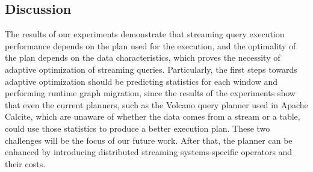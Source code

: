 %             
%             
%             


\subsection{Discussion}

The results of our experiments demonstrate that streaming query execution performance depends on the plan used for the execution, and the optimality of the plan depends on the data characteristics, which proves the necessity of adaptive optimization of streaming queries. Particularly, the first steps towards adaptive optimization should be predicting statistics for each window and performing runtime graph migration, since the results of the experiments show that even the current planners, such as the Volcano query planner \cite{graefe1993volcano} used in Apache Calcite, which are unaware of whether the data comes from a stream or a table, could use those statistics to produce a better execution plan. These two challenges will be the focus of our future work. After that, the planner can be enhanced by introducing distributed streaming systems-specific operators and their costs.


